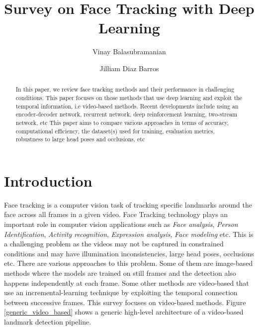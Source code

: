 \documentclass{llncs}
\begin{document}
\pagestyle{headings}  %

%
\title{Survey on Face Tracking with Deep Learning}
%
%
\author{Vinay Balasubramanian \and Jilliam Diaz Barros}
%
%

\maketitle              %

\begin{abstract}
In this paper, we review face tracking methods and their performance in challenging conditions. This paper focuses on those methods that use deep learning and exploit the temporal information, i.e video-based methods. Recent developments include using an encoder-decoder network, recurrent network, deep reinforcement learning, two-stream network, etc This paper aims to compare various approaches in terms of accuracy, computational efficiency, the dataset(s) used for training, evaluation metrics, robustness to large head poses and occlusions, etc
\end{abstract}


\section{Introduction}
Face tracking is a computer vision task of tracking specific landmarks around the face across all frames in a given video.
Face Tracking technology plays an important role in computer vision applications such as \textit{Face analysis}, \textit{Person Identification}, \textit{Activity recognition}, \textit{Expression analysis}, \textit{Face modeling} etc. This is a challenging problem as the videos may not be captured in constrained conditions and may have illumination inconsistencies, large head poses, occlusions etc.
There are various approaches to this problem. Some of them are image-based methods where the models are trained on still frames and the detection also happens independently at each frame. Some other methods are video-based that use an incremental-learning technique by exploiting the temporal connection between successive frames. This survey focuses on video-based methods. Figure \textcolor{red}{\ref{generic_video_based}} shows a generic high-level architecture of a video-based landmark detection pipeline.
\end{document}
